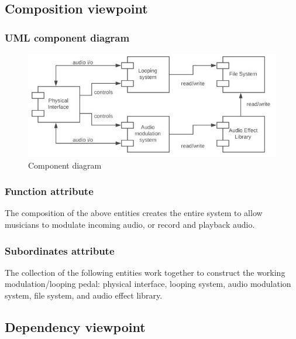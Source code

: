 \clearpage
\subsection{Composition viewpoint}

    \subsubsection{UML component diagram}
        \begin{figure}[!ht]
            \centering
            \includegraphics{diagrams/component-diagram.JPG}
            \caption{Component diagram}
            \label{fig:component}
        \end{figure}
    \subsubsection{Function attribute}
        The composition of the above entities creates the entire system to allow musicians to modulate incoming audio, or record and playback audio.
        
    \subsubsection{Subordinates attribute}
        The collection of the following entities work together to construct the working modulation/looping pedal: physical interface, looping system, audio modulation system, file system, and audio effect library.
\clearpage
\subsection{Dependency viewpoint}


